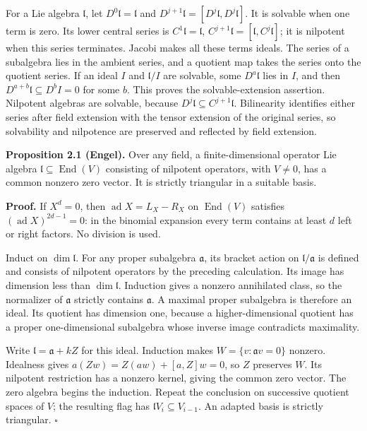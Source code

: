 \documentclass[11pt,a4paper,openany]{report}
\begin{document}
For a Lie algebra \(\mathfrak l\), let \(D^0\mathfrak l=\mathfrak l\) and \(D^{j+1}\mathfrak l=[D^j\mathfrak l,D^j\mathfrak l]\). It is solvable when one term is zero. Its lower central series is \(C^1\mathfrak l=\mathfrak l\), \(C^{j+1}\mathfrak l=[\mathfrak l,C^j\mathfrak l]\); it is nilpotent when this series terminates. Jacobi makes all these terms ideals. The series of a subalgebra lies in the ambient series, and a quotient map takes the series onto the quotient series. If an ideal \(I\) and \(\mathfrak l/I\) are solvable, some \(D^a\mathfrak l\) lies in \(I\), and then \(D^{a+b}\mathfrak l\subseteq D^bI=0\) for some \(b\). This proves the solvable-extension assertion. Nilpotent algebras are solvable, because \(D^j\mathfrak l\subseteq C^{j+1}\mathfrak l\). Bilinearity identifies either series after field extension with the tensor extension of the original series, so solvability and nilpotence are preserved and reflected by field extension.

\textbf{Proposition 2.1 (Engel).} Over any field, a finite-dimensional operator Lie algebra \(\mathfrak l\subseteq\operatorname{End}(V)\) consisting of nilpotent operators, with \(V\ne0\), has a common nonzero zero vector. It is strictly triangular in a suitable basis.

\textbf{Proof.} If \(X^d=0\), then \(\operatorname{ad}X=L_X-R_X\) on \(\operatorname{End}(V)\) satisfies \((\operatorname{ad}X)^{2d-1}=0\): in the binomial expansion every term contains at least \(d\) left or right factors. No division is used.

Induct on \(\dim\mathfrak l\). For any proper subalgebra \(\mathfrak a\), its bracket action on \(\mathfrak l/\mathfrak a\) is defined and consists of nilpotent operators by the preceding calculation. Its image has dimension less than \(\dim\mathfrak l\). Induction gives a nonzero annihilated class, so the normalizer of \(\mathfrak a\) strictly contains \(\mathfrak a\). A maximal proper subalgebra is therefore an ideal. Its quotient has dimension one, because a higher-dimensional quotient has a proper one-dimensional subalgebra whose inverse image contradicts maximality.

Write \(\mathfrak l=\mathfrak a+kZ\) for this ideal. Induction makes \(W=\{v:\mathfrak a v=0\}\) nonzero. Idealness gives \(a(Zw)=Z(aw)+[a,Z]w=0\), so \(Z\) preserves \(W\). Its nilpotent restriction has a nonzero kernel, giving the common zero vector. The zero algebra begins the induction. Repeat the conclusion on successive quotient spaces of \(V\); the resulting flag has \(\mathfrak lV_i\subseteq V_{i-1}\). An adapted basis is strictly triangular. \(\square\)
\end{document}
